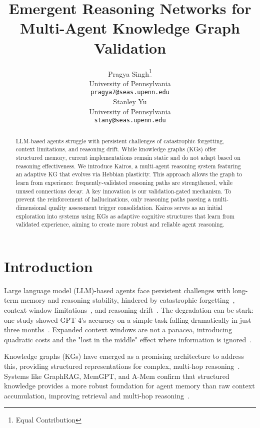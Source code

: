 \documentclass{article}
\title{Emergent Reasoning Networks for Multi-Agent Knowledge Graph Validation}
\author{%
  Pragya Singh\thanks{Equal Contribution}\\
  University of Pennsylvania\\
  \texttt{pragya7@seas.upenn.edu} \\
  \And
  Stanley Yu\footnotemark[1]\\
  University of Pennsylvania \\
  \texttt{stany@seas.upenn.edu} \\
}
\begin{document}
\maketitle


\begin{abstract}
  LLM-based agents struggle with persistent challenges of catastrophic forgetting, context limitations, and reasoning drift. While knowledge graphs (KGs) offer structured memory, current implementations remain static and do not adapt based on reasoning effectiveness. We introduce Kairos, a multi-agent reasoning system featuring an adaptive KG that evolves via Hebbian plasticity. This approach allows the graph to learn from experience: frequently-validated reasoning paths are strengthened, while unused connections decay. A key innovation is our validation-gated mechanism. To prevent the reinforcement of hallucinations, only reasoning paths passing a multi-dimensional quality assessment trigger consolidation. Kairos serves as an initial exploration into systems using KGs as adaptive cognitive structures that learn from validated experience, aiming to create more robust and reliable agent reasoning.
\end{abstract}

\section{Introduction}

Large language model (LLM)-based agents face persistent challenges with long-term memory and reasoning stability, hindered by catastrophic forgetting~\citep{li-etal-2024-revisiting,luo2023empirical}, context window limitations~\citep{packer2023memgpt}, and reasoning drift~\citep{chen2023chatgpt}. The degradation can be stark: one study showed GPT-4's accuracy on a simple task falling dramatically in just three months~\citep{chen2023chatgpt}. Expanded context windows are not a panacea, introducing quadratic costs and the "lost in the middle" effect where information is ignored~\citep{packer2023memgpt}.

Knowledge graphs (KGs) have emerged as a promising architecture to address this, providing structured representations for complex, multi-hop reasoning~\citep{pan2024unifying}. Systems like GraphRAG, MemGPT, and A-Mem confirm that structured knowledge provides a more robust foundation for agent memory than raw context accumulation, improving retrieval and multi-hop reasoning~\citep{edge2024graphrag,packer2023memgpt,xu2025amem}.
\end{document}
